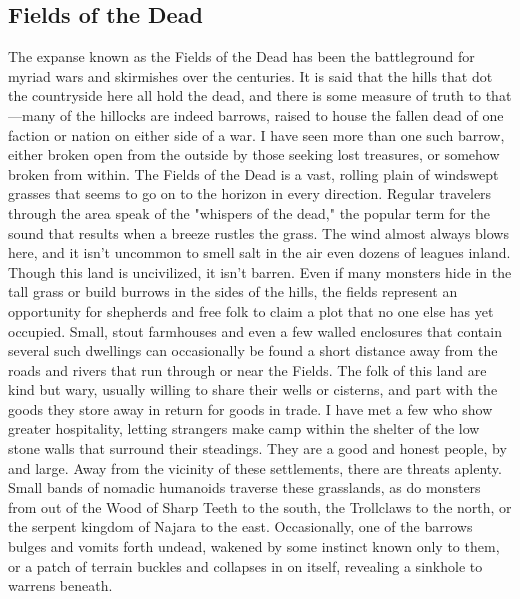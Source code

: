 \documentclass[10pt,a4paper,twoside,twocolumn,openany,bg=print,nodeprecatedcode]{dndbook}
\begin{document}
\subsection{Fields of the Dead}
The expanse known as the Fields of the Dead has been the battleground for myriad wars and skirmishes over the centuries. It is said that the hills that dot the countryside here all hold the dead, and there is some measure of truth to that—many of the hillocks are indeed barrows, raised to house the fallen dead of one faction or nation on either side of a war. I have seen more than one such barrow, either broken open from the outside by those seeking lost treasures, or somehow broken from within.
The Fields of the Dead is a vast, rolling plain of windswept grasses that seems to go on to the horizon in every direction. Regular travelers through the area speak of the "whispers of the dead," the popular term for the sound that results when a breeze rustles the grass. The wind almost always blows here, and it isn't uncommon to smell salt in the air even dozens of leagues inland.
Though this land is uncivilized, it isn't barren. Even if many monsters hide in the tall grass or build burrows in the sides of the hills, the fields represent an opportunity for shepherds and free folk to claim a plot that no one else has yet occupied. Small, stout farmhouses and even a few walled enclosures that contain several such dwellings can occasionally be found a short distance away from the roads and rivers that run through or near the Fields.
The folk of this land are kind but wary, usually willing to share their wells or cisterns, and part with the goods they store away in return for goods in trade. I have met a few who show greater hospitality, letting strangers make camp within the shelter of the low stone walls that surround their steadings. They are a good and honest people, by and large.
Away from the vicinity of these settlements, there are threats aplenty. Small bands of nomadic humanoids traverse these grasslands, as do monsters from out of the Wood of Sharp Teeth to the south, the Trollclaws to the north, or the serpent kingdom of Najara to the east. Occasionally, one of the barrows bulges and vomits forth undead, wakened by some instinct known only to them, or a patch of terrain buckles and collapses in on itself, revealing a sinkhole to warrens beneath.
\end{document}
